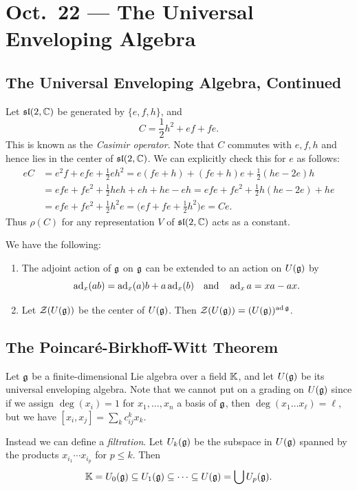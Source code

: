 \chapter{Oct.~22 --- The Universal Enveloping Algebra}

\section{The Universal Enveloping Algebra, Continued}

\begin{example}
  Let $\mathfrak{sl}(2, \mathbb{C})$ be generated
  by $\{e, f, h\}$, and
  \[
    C = \frac{1}{2} h^2 + ef + fe.
  \]
  This is known as the \emph{Casimir operator}.
  Note that $C$ commutes with
  $e, f, h$ and hence lies in the
  center of $\mathfrak{sl}(2, \mathbb{C})$.
  We can explicitly check this for $e$
  as follows:
  \begin{align*}
    eC
    &= e^2 f + efe + \frac{1}{2} eh^2
    = e(fe + h) + (fe + h) e
    + \frac{1}{2} (he - 2e) h \\
    &= efe + fe^2 + \frac{1}{2} heh + eh + he - eh
    = efe + fe^2 + \frac{1}{2} h(he - 2e) + he \\
    &= efe + fe^2 + \frac{1}{2} h^2 e
    = \big(ef + fe + \frac{1}{2} h^2\big) e
    = Ce.
  \end{align*}
  Thus $\rho(C)$ for any representation
  $V$ of $\mathfrak{sl}(2, \mathbb{C})$
  acts as a constant.
\end{example}

\begin{prop}
  We have the following:
  \begin{enumerate}
    \item The adjoint action of $\mathfrak{g}$ on
      $\mathfrak{g}$ can be extended to an action
      on $U(\mathfrak{g})$ by
      \[
        \operatorname{ad}_x(a b)
        = \operatorname{ad}_x(a) b + a \operatorname{ad}_x(b)
        \quad\text{and}\quad
        \operatorname{ad}_x a = xa - ax.
      \]
    \item Let $\mathcal{Z}(U(\mathfrak{g}))$ be the
      center of $U(\mathfrak{g})$. Then
      $\mathcal{Z}(U(\mathfrak{g})) = (U(\mathfrak{g}))^{\operatorname{ad} \mathfrak{g}}$.
  \end{enumerate}
\end{prop}

\section{The Poincar\'e-Birkhoff-Witt Theorem}

\begin{remark}
  Let $\mathfrak{g}$ be a finite-dimensional Lie
  algebra over a field $\mathbb{K}$, and let
  $U(\mathfrak{g})$ be its universal enveloping
  algebra. Note that we cannot put
  on a grading on $U(\mathfrak{g})$ since
  if we assign $\deg(x_i) = 1$ for
  $x_1, \dots, x_n$ a basis of $\mathfrak{g}$,
  then $\deg(x_1 \dots x_\ell) = \ell$,
  but we have
  $[x_i, x_j] = \sum_k c_{ij}^k x_k$.

  Instead we can define a \emph{filtration}.
  Let $U_k(\mathfrak{g})$ be the subspace in $U(\mathfrak{g})$
  spanned by the products
  $x_{i_1} \cdots x_{i_p}$ for $p \le k$. Then
  \[
    \mathbb{K} = U_0(\mathfrak{g}) \subseteq U_1(\mathfrak{g})
    \subseteq \cdots
    \subseteq U(\mathfrak{g}) = \bigcup U_p(\mathfrak{g}).
  \]
\end{remark}

